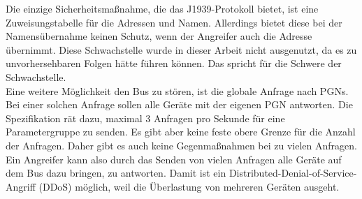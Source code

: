 Die einzige Sicherheitsmaßnahme, die das J1939-Protokoll bietet, ist eine Zuweisungstabelle für die Adressen und Namen. Allerdings
bietet diese bei der Namensübernahme keinen Schutz, wenn der Angreifer auch die Adresse übernimmt. Diese Schwachstelle 
wurde in dieser Arbeit nicht ausgenutzt, da es zu unvorhersehbaren Folgen hätte führen können. Das spricht für die 
Schwere der Schwachstelle.\\
Eine weitere Möglichkeit den Bus zu stören, ist die globale Anfrage nach PGNs. Bei einer solchen Anfrage sollen alle Geräte
mit der eigenen PGN antworten. Die Spezifikation rät dazu, maximal 3 Anfragen pro Sekunde für eine Parametergruppe zu senden.
Es gibt aber keine feste obere Grenze für die Anzahl der Anfragen. Daher gibt es auch keine Gegenmaßnahmen bei zu vielen 
Anfragen. Ein Angreifer kann also durch das Senden von vielen Anfragen alle Geräte auf dem Bus dazu bringen, zu antworten.
Damit ist ein Distributed-Denial-of-Service-Angriff (DDoS) möglich, weil die Überlastung von mehreren Geräten ausgeht. \\
\cite{Murvay2018}

